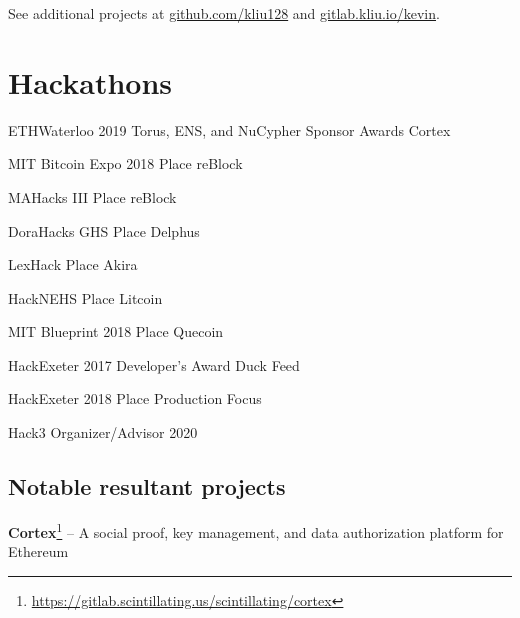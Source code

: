 \documentclass[paper=letter]{tccv}
\begin{document}
See additional projects at \href{https://github.com/kliu128}{github.com/kliu128} and \href{https://gitlab.kliu.io/kevin}{gitlab.kliu.io/kevin}.
    

\section{Hackathons}

\begin{yearlist}

\item{ETHWaterloo 2019}
     {Torus, ENS, and NuCypher Sponsor Awards}
     {Cortex}

\item{MIT Bitcoin Expo 2018}
     { Place}
     {reBlock}

\item{MAHacks III}
     { Place}
     {reBlock}

\item{DoraHacks GHS}
     { Place}
     {Delphus}

\item{LexHack}
     { Place}
     {Akira}

\item{HackNEHS}
     { Place}
     {Litcoin}

\item{MIT Blueprint 2018}
     { Place}
     {Quecoin}

\item{HackExeter 2017}
     {Developer's Award}
     {Duck Feed}

\item{HackExeter 2018}
     { Place}
     {Production Focus}

\item{Hack3}
     {Organizer/Advisor}
     {2020}
\end{yearlist}

\subsection{Notable resultant projects}

\textbf{Cortex}\footnote{\url{https://gitlab.scintillating.us/scintillating/cortex}} -- A social proof, key management, and data authorization platform for Ethereum
\end{document}
